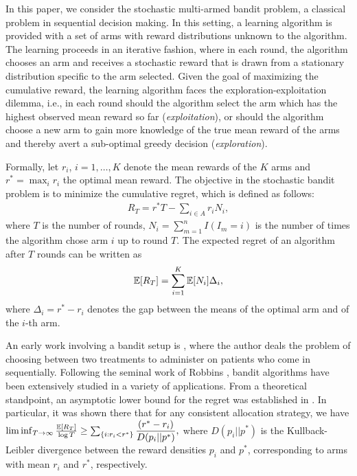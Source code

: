 In this paper, we consider the stochastic multi-armed bandit problem, a classical problem in sequential decision making. In this setting,  a learning algorithm is provided with a set of arms with reward distributions unknown to the algorithm. The learning proceeds in an iterative fashion, where in each round, the algorithm chooses an arm and receives a stochastic reward that is drawn from a stationary distribution specific to the arm selected.  
Given the goal of maximizing the cumulative reward, the learning algorithm faces the exploration-exploitation dilemma, i.e., in each round should the algorithm select the arm which has the highest observed mean reward so far 
(\textit{exploitation}), or should the algorithm choose a new arm to gain more knowledge of the true mean reward of the arms and thereby avert a sub-optimal greedy decision (\textit{exploration}). 

Formally, let $r_i$, $i=1,\ldots,K$ denote the mean rewards of the $K$ arms and $r^* = \max_i r_i$ the optimal mean reward. The objective in the stochastic bandit problem is to minimize the cumulative regret, which is defined as follows:
\begin{align*}
R_{T}=r^{*}T - \sum_{i\in A} r_{i}N_{i},
\end{align*}
where $T$ is the number of rounds, $N_{i}=\sum_{m=1}^n I(I_m=i)$ is the number of times the algorithm chose arm $i$ up to round $T$.
The expected regret of an algorithm after $T$ rounds can be written as
\begin{align*}
\mathbb{E}[R_{T}]= \sum_{i=1}^K \mathbb{E}[N_i] \Delta_i,
\end{align*}
where $\Delta_{i}=r^{*}-r_{i}$ denotes the gap between the means of the optimal arm and of the $i$-th arm. 


                                                                                                                                          


An early work involving a bandit setup is \cite{thompson1933likelihood}, where the author deals the problem of choosing between two treatments to administer on patients who come in sequentially. Following the seminal work of Robbins \cite{robbins1952some}, bandit algorithms have been extensively studied in a variety of applications. 
From a theoretical standpoint, an asymptotic lower bound for the regret was established in \cite{lai1985asymptotically}. In particular, it was shown there that for any consistent allocation strategy, we have
$\liminf_{T \to \infty}\frac{\mathbb{E}[R_{T}]}{\log T}\geq\sum_{\{i:r_{i}<r^{*}\}}\dfrac{(r^{*}-r_{i})}{D(p_{i}||p^{*})},$
where $D(p_{i}||p^{*})$ is the Kullback-Leibler divergence between the reward densities $p_{i}$ and $p^{*}$, corresponding to arms with mean $r_{i}$ and $r^{*}$, respectively.

